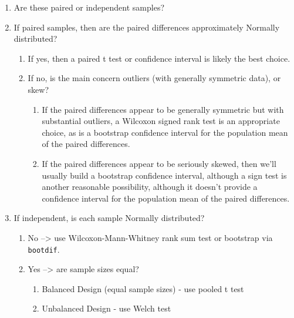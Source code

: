 \documentclass[
]{book}
\providecommand{\tightlist}{%
  \setlength{\itemsep}{0pt}\setlength{\parskip}{0pt}}
\begin{document}
\begin{enumerate}
\def\labelenumi{\arabic{enumi}.}
\item
  Are these paired or independent samples?
\item
  If paired samples, then are the paired differences approximately Normally distributed?

  \begin{enumerate}
  \def\labelenumii{\alph{enumii}.}
  \tightlist
  \item
    If yes, then a paired t test or confidence interval is likely the best choice.
  \item
    If no, is the main concern outliers (with generally symmetric data), or skew?

    \begin{enumerate}
    \def\labelenumiii{\arabic{enumiii}.}
    \tightlist
    \item
      If the paired differences appear to be generally symmetric but with substantial outliers, a Wilcoxon signed rank test is an appropriate choice, as is a bootstrap confidence interval for the population mean of the paired differences.
    \item
      If the paired differences appear to be seriously skewed, then we'll usually build a bootstrap confidence interval, although a sign test is another reasonable possibility, although it doesn't provide a confidence interval for the population mean of the paired differences.
    \end{enumerate}
  \end{enumerate}
\item
  If independent, is each sample Normally distributed?

  \begin{enumerate}
  \def\labelenumii{\alph{enumii}.}
  \tightlist
  \item
    No --\textgreater{} use Wilcoxon-Mann-Whitney rank sum test or bootstrap via \texttt{bootdif}.
  \item
    Yes --\textgreater{} are sample sizes equal?

    \begin{enumerate}
    \def\labelenumiii{\arabic{enumiii}.}
    \tightlist
    \item
      Balanced Design (equal sample sizes) - use pooled t test
    \item
      Unbalanced Design - use Welch test
    \end{enumerate}
  \end{enumerate}
\end{enumerate}
\end{document}
